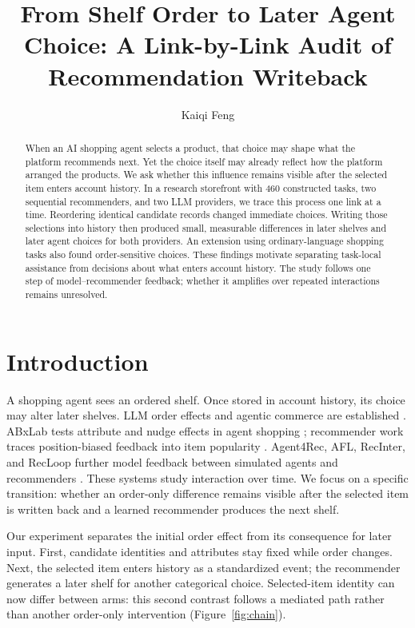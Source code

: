 \documentclass[sigconf]{acmart}
\title{From Shelf Order to Later Agent Choice: A Link-by-Link Audit of Recommendation Writeback}
\author{Kaiqi Feng}
\affiliation{%
  \department{College of Design and Innovation}
  \institution{Tongji University}
  \city{Shanghai}
  \country{China}}
\begin{document}
\begin{abstract}
When an AI shopping agent selects a product, that choice may shape what the
platform recommends next. Yet the choice itself may already reflect how the
platform arranged the products. We ask whether this influence remains visible
after the selected item enters account history. In a research storefront with
460 constructed tasks, two sequential recommenders, and two LLM providers, we
trace this process one link at a time. Reordering identical candidate records
changed immediate choices. Writing those selections into history then produced
small, measurable differences in later shelves and later agent choices for
both providers. An extension using ordinary-language shopping tasks also found
order-sensitive choices. These findings motivate separating task-local
assistance from decisions about what enters account history. The study follows
one step of model--recommender feedback; whether it amplifies over repeated
interactions remains unresolved.
\end{abstract}

\maketitle

\section{Introduction}

A shopping agent sees an ordered shelf. Once stored in account history, its
choice may alter later shelves. LLM order effects and agentic commerce are
established \cite{bito2025position,allouah2025agentbuying,zhang2026ranked}.
ABxLab tests attribute and nudge effects in agent shopping
\cite{cherep2026abxlab}; recommender work traces position-biased feedback into
item popularity \cite{dzhoha2024position}. Agent4Rec, AFL, RecInter, and
RecLoop further model feedback between simulated agents and recommenders
\cite{zhang2024agent4rec,cai2025afl,jin2025recinter,yang2026recloop}. These
systems study interaction over time. We focus on a specific transition:
whether an order-only difference remains visible after the selected item is
written back and a learned recommender produces the next shelf.

Our experiment separates the initial order effect from its consequence for
later input. First, candidate identities and attributes stay fixed while order
changes. Next, the selected item enters history as a standardized event; the
recommender generates a later shelf for another categorical choice.
Selected-item identity can now differ between arms: this second contrast
follows a mediated path rather than another order-only intervention
(Figure~\ref{fig:chain}).
\end{document}

